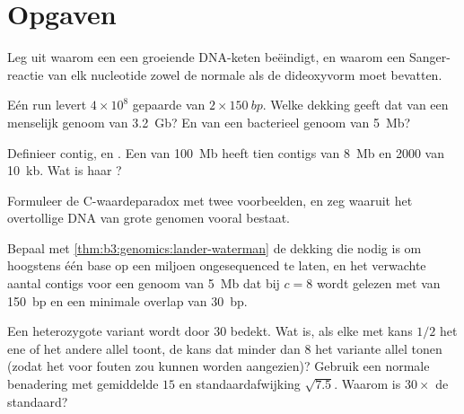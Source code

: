 \section{Opgaven}

\begin{exercise}[$\star$]\label{exo:b3:genomics:1}
Leg uit waarom een  een groeiende DNA-keten beëindigt,
en waarom een Sanger-reactie van elk nucleotide zowel de normale als de
dideoxyvorm moet bevatten.
\end{exercise}

\begin{exercise}[$\star$]\label{exo:b3:genomics:2}
Eén run levert $4\times 10^{8}$ gepaarde  van
$2\times \qty{150}{bp}$. Welke dekking geeft dat van een menselijk
genoom van \qty{3.2}{Gb}? En van een bacterieel genoom van \qty{5}{Mb}?
\end{exercise}

\begin{exercise}[$\star$]\label{exo:b3:genomics:3}
Definieer contig,  en . Een  van \qty{100}{Mb}
heeft tien contigs van \qty{8}{Mb} en \num{2000} van \qty{10}{kb}. Wat
is haar ?
\end{exercise}

\begin{exercise}[$\star$]\label{exo:b3:genomics:4}
Formuleer de C-waardeparadox met twee voorbeelden, en zeg waaruit het
overtollige DNA van grote genomen vooral bestaat.
\end{exercise}

\begin{exercise}[$\star\star$]\label{exo:b3:genomics:5}
Bepaal met \cref{thm:b3:genomics:lander-waterman} de dekking die nodig
is om hoogstens één base op een miljoen ongesequenced te laten, en het
verwachte aantal contigs voor een genoom van \qty{5}{Mb} dat bij
$c = 8$ wordt gelezen met  van \qty{150}{bp} en een minimale
overlap van \qty{30}{bp}.
\end{exercise}

\begin{exercise}[$\star\star$]\label{exo:b3:genomics:6}
Een heterozygote variant wordt door $30$  bedekt. Wat is, als elke
 met kans $1/2$ het ene of het andere allel toont, de kans dat
minder dan $8$  het variante allel tonen (zodat het voor fouten
zou kunnen worden aangezien)? Gebruik een normale benadering met
gemiddelde $15$ en standaardafwijking $\sqrt{7.5}$. Waarom is
$30\times$ de standaard?
\end{exercise}


